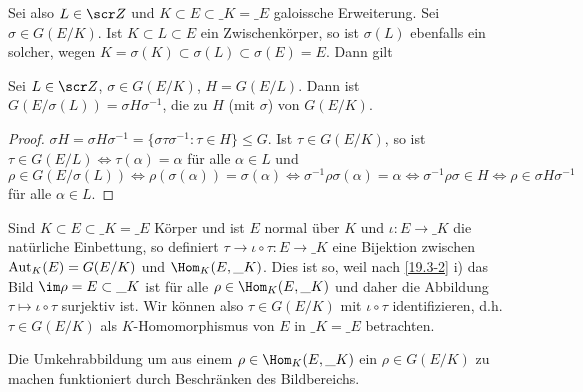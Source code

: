 Sei also $L \in \scr Z$ und $K \subset E \subset \_K = \_E$ galoissche Erweiterung.
Sei $\sigma \in G(E / K)$.
Ist $K \subset L \subset E$ ein Zwischenkörper, so ist $\sigma(L)$ ebenfalls ein solcher, wegen $K = \sigma(K) \subset \sigma(L) \subset \sigma(E) = E$.
Dann gilt

\begin{st} \label{19.4-15}
	Sei $L \in \scr Z$, $\sigma \in G(E / K)$, $H = G(E / L)$.
	Dann ist $G(E / \sigma(L)) = \sigma H \sigma^{-1}$, die zu $H$ (mit $\sigma$)  von $G(E / K)$.
	\begin{proof}
		$\sigma H = \sigma H \sigma^{-1} = \{ \sigma \tau \sigma^{-1} : \tau \in H \} \le G$.
		Ist $\tau \in G(E / K)$, so ist $\tau \in G(E / L) \iff \tau(\alpha) = \alpha$ für alle $\alpha \in L$ und $\rho \in G(E / \sigma(L)) \iff \rho(\sigma(\alpha)) = \sigma(\alpha) \iff \sigma^{-1}\rho\sigma(\alpha) = \alpha \iff \sigma^{-1}\rho\sigma \in H \iff \rho \in \sigma H \sigma^{-1}$ für alle $\alpha \in L$.
	\end{proof}
\end{st}

\begin{nt} \label{19.4-16}
	Sind $K \subset E \subset \_K = \_E$ Körper und ist $E$ normal über $K$ und $\iota: E \to \_K$ die natürliche Einbettung, so definiert $\tau \to \iota \circ \tau : E \to \_K$ eine Bijektion zwischen $\operatorname{Aut}_K(E) = G(E / K)$ und $\Hom_K(E, \_K)$.
	Dies ist so, weil nach \ref{19.3-2} i) das Bild $\im \rho = E \subset \_K$ ist für alle $\rho \in \Hom_K (E, \_K)$ und daher die Abbildung $\tau \mapsto \iota \circ \tau$ surjektiv ist.
	Wir können also $\tau \in G(E / K)$ mit $\iota \circ \tau$ identifizieren, d.h. $\tau \in G(E / K)$ als $K$-Homomorphismus von $E$ in $\_K = \_E$ betrachten.

	Die Umkehrabbildung um aus einem $\rho \in \Hom_K(E, \_K)$ ein $\rho \in G(E / K)$ zu machen funktioniert durch Beschränken des Bildbereichs.
\end{nt}

